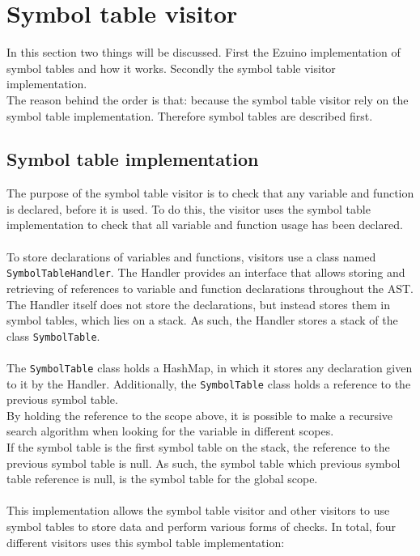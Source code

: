 \section{Symbol table visitor}
In this section two things will be discussed. First the Ezuino implementation of symbol tables and how it works. Secondly the symbol table visitor implementation.\\
The reason behind the order is that: because the symbol table visitor rely on the symbol table implementation. Therefore symbol tables are described first.

\subsection{Symbol table implementation}\label{SymbolTableImpl}
The purpose of the symbol table visitor is to check that any variable and function is declared, before it is used. To do this, the visitor uses the symbol table implementation to check that all variable and function usage has been declared.
\\\\
To store declarations of variables and functions, visitors use a class named \texttt{SymbolTableHandler}. The Handler provides an interface that allows storing and retrieving of references to variable and function declarations throughout the AST.
The Handler itself does not store the declarations, but instead stores them in symbol tables, which lies on a stack. As such, the Handler stores a stack of the class \texttt{SymbolTable}.
\\\\
The \texttt{SymbolTable} class holds a HashMap, in which it stores any declaration given to it by the Handler. Additionally, the \texttt{SymbolTable} class holds a reference to the previous symbol table.\\
By holding the reference to the scope above, it is possible to make a recursive search algorithm when looking for the variable in different scopes.\\
If the symbol table is the first symbol table on the stack, the reference to the previous symbol table is null. As such, the symbol table which previous symbol table reference is null, is the symbol table for the global scope.
\\\\
This implementation allows the symbol table visitor and other visitors to use symbol tables to store data and perform various forms of checks. In total, four different visitors uses this symbol table implementation:
